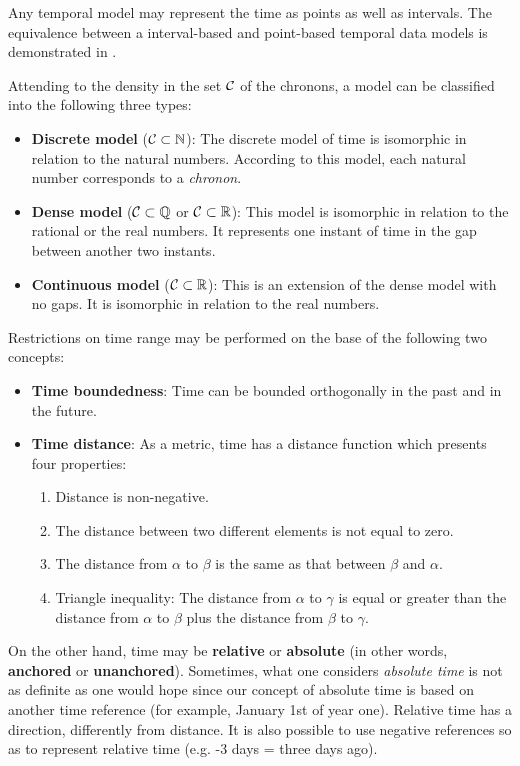 Any temporal model may represent the time as points as well as intervals. The equivalence between a interval-based and point-based temporal data models is demonstrated in \cite{Böhlen_point-versus}.

Attending to the density in the set $\mathcal{C}$ of the chronons, a model can be classified into the following three types:

\begin{itemize}
\item
\textbf{Discrete model} ($\mathcal{C} \subset \mathbb{N}$):  The discrete model of time is isomorphic in relation to the natural numbers. According to this model, each natural number corresponds to a \emph{chronon}.
\item
\textbf{Dense model} ($\mathcal{C} \subset \mathbb{Q}$ or $\mathcal{C} \subset \mathbb{R}$): This model is isomorphic in relation to the rational or the real numbers. It represents one instant of time in the gap between another two instants. 
\item
\textbf{Continuous model} ($\mathcal{C} \subset \mathbb{R}$): This is an extension of the dense model with no gaps. It is isomorphic in relation to the real numbers. 
\end{itemize}




Restrictions on time range may be performed on the base of the following two concepts:
\begin{itemize}
\item
\textbf{Time boundedness}: Time can be bounded orthogonally in the past and in the future.
\item
\textbf{Time distance}: As a metric, time has a distance function which presents four properties:
\begin{enumerate}
\item
Distance is non-negative.
\item
The distance between two different elements is not equal to zero.
\item
The distance from $\alpha$ to $\beta$ is the same as that between $\beta$ and $\alpha$.
\item
Triangle inequality: The distance from $\alpha$ to $\gamma$ is equal or greater than the distance from $\alpha$ to $\beta$ plus the distance from $\beta$ to $\gamma$.
\end{enumerate}
\end{itemize}

On the other hand, time may be \textbf{relative} or \textbf{absolute} (in other words, \textbf{anchored} or \textbf{unanchored}). Sometimes, what one considers \emph{absolute time} is not as definite as one would hope since our concept of absolute time is based on another time reference (for example, January 1st of year one). Relative time has a direction, differently from distance. It is also possible to use negative references so as to represent relative time (e.g. -3 days = three days ago).


